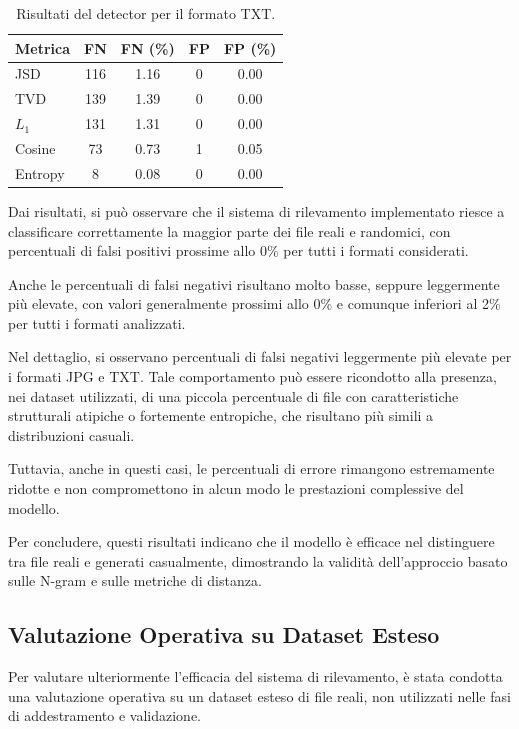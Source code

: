 \documentclass{report}
\begin{document}
\begin{table}[H]
\centering
\begin{tabular}{lcccc}
\toprule
Metrica & FN & FN (\%) & FP & FP (\%) \\
\midrule
JSD     & 116 & 1.16 & 0 & 0.00 \\
TVD     & 139 & 1.39 & 0 & 0.00 \\
$L_1$   & 131 & 1.31 & 0 & 0.00 \\
Cosine  & 73  & 0.73 & 1 & 0.05 \\
Entropy & 8   & 0.08 & 0 & 0.00 \\
\bottomrule
\end{tabular}
\caption{Risultati del detector per il formato TXT.}
\end{table}


Dai risultati, si può osservare che il sistema di rilevamento implementato riesce a classificare correttamente
la maggior parte dei file reali e randomici, con percentuali di falsi positivi prossime allo 0\% per tutti i formati considerati.

\bigskip

Anche le percentuali di falsi negativi risultano molto basse, seppure leggermente più elevate,
con valori generalmente prossimi allo 0\% e comunque inferiori al 2\% per tutti i formati analizzati.


Nel dettaglio, si osservano percentuali di falsi negativi leggermente più elevate
per i formati JPG e TXT. Tale comportamento può essere ricondotto alla presenza,
nei dataset utilizzati, di una piccola percentuale di file con caratteristiche
strutturali atipiche o fortemente entropiche, che risultano più simili a
distribuzioni casuali.

Tuttavia, anche in questi casi, le percentuali di errore rimangono estremamente
ridotte e non compromettono in alcun modo le prestazioni complessive del modello.

\bigskip

Per concludere, questi risultati indicano che il modello è efficace nel distinguere tra file reali e generati casualmente,
dimostrando la validità dell'approccio basato sulle N-gram e sulle metriche di distanza.


\subsection{Valutazione Operativa su Dataset Esteso}

Per valutare ulteriormente l'efficacia del sistema di rilevamento, è stata condotta una valutazione operativa
su un dataset esteso di file reali, non utilizzati nelle fasi di addestramento e validazione.
\end{document}
